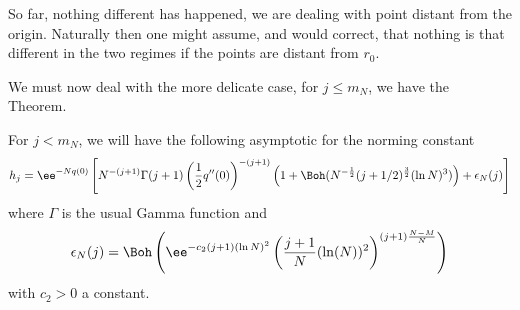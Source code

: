 So far, nothing different has happened, we are dealing with point distant from the origin. Naturally then one might assume, and would correct, that nothing is that different in the two regimes if the points are distant from $r_0$. 

 We must now deal with the more delicate case, for $j \leq m_N$, we have the Theorem.

\begin{teorema}
	For $j < m_N$, we will have the following asymptotic for the norming constant
	\begin{equation}
	 h_j =  \ee^{-N q(0)} \left[ N^{-(j+1)} \Gamma(j+1)\left(\frac{1}{2} q''(0)\right)^{-(j+1)} \left( 1 + \Boh(N^{-\frac{1}{2}} (j+1/2)^{\frac{3}{2}} (\ln N)^3) \right)+ \epsilon_N(j) \right]
	\end{equation}
	where $\Gamma$ is the usual Gamma function and 
	\begin{equation}
		\epsilon_N(j) = \Boh\left(\ee^{-c_2 (j + 1) (\ln N)^2}  \left(\frac{j+1}{N} (\ln(N))^2 \right)^{(j+1) \frac{N-M}{N}} \right)
	\end{equation}
	with $c_2 > 0$ a constant.
	\label{Theorem: hj disk j<mn}
\end{teorema}

